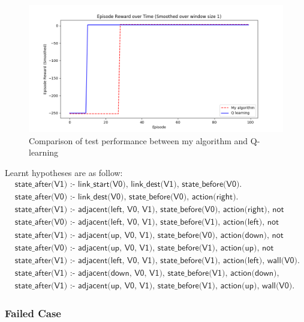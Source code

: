 \begin{figure}[!htb]
\centering
\includegraphics[width=1.0\textwidth]{./figures/experiment3_test}
\caption{Comparison of test performance between my algorithm and Q-learning}
\label{experiment1_test}
\end{figure}
       
Learnt hypotheses are as follow:
\begin{equation*}
\begin{split}
&\textsf{state\_after(V1) :- link\_start(V0), link\_dest(V1), state\_before(V0).}\\
&\textsf{state\_after(V0) :- link\_dest(V0), state\_before(V0), action(right).}\\
&\textsf{state\_after(V1) :- adjacent(left, V0, V1), state\_before(V0), action(right), not wall(V1).}\\
&\textsf{state\_after(V0) :- adjacent(left, V0, V1), state\_before(V1), action(left), not wall(V0).}\\
&\textsf{state\_after(V1) :- adjacent(up, V0, V1), state\_before(V0), action(down), not wall(V1).}\\
&\textsf{state\_after(V0) :- adjacent(up, V0, V1), state\_before(V1), action(up), not wall(V0).}\\
&\textsf{state\_after(V1) :- adjacent(left, V0, V1), state\_before(V1), action(left), wall(V0).}\\
&\textsf{state\_after(V1) :- adjacent(down, V0, V1), state\_before(V1), action(down), wall(V0).}\\
&\textsf{state\_after(V1) :- adjacent(up, V0, V1), state\_before(V1), action(up), wall(V0).}
\end{split}
\end{equation*}

\newpage
\subsubsection{Failed Case}

